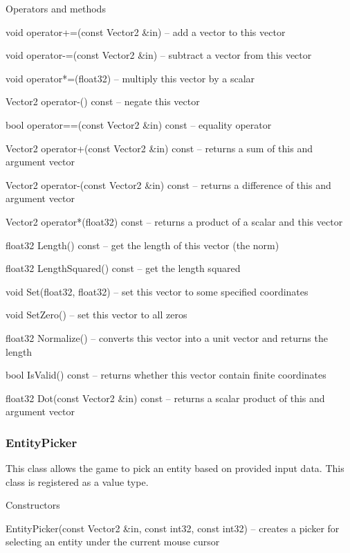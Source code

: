 \begin{titled-itemize}{Operators and methods}
  \item void operator+=(const Vector2 \&in) -- add a vector to this vector
  \item void operator-=(const Vector2 \&in) -- subtract a vector from this vector
  \item void operator*=(float32) -- multiply this vector by a scalar
  \item Vector2 operator-() const -- negate this vector
  \item bool operator==(const Vector2 \&in) const -- equality operator
  \item Vector2 operator+(const Vector2 \&in) const -- returns a sum of this and argument vector
  \item Vector2 operator-(const Vector2 \&in) const -- returns a difference of this and argument vector
  \item Vector2 operator*(float32) const -- returns a product of a scalar and this vector
  \item float32 Length() const -- get the length of this vector (the norm)
  \item float32 LengthSquared() const -- get the length squared
  \item void Set(float32, float32) -- set this vector to some specified coordinates
  \item void SetZero() -- set this vector to all zeros
  \item float32 Normalize() -- converts this vector into a unit vector and returns the length
  \item bool IsValid() const -- returns whether this vector contain finite coordinates
  \item float32 Dot(const Vector2 \&in) const -- returns a scalar product of this and argument vector
\end{titled-itemize}

\subsubsection{EntityPicker}

This class allows the game to pick an entity based on provided input data. This class is registered as a value type.

\begin{titled-itemize}{Constructors}
  \item EntityPicker(const Vector2 \&in, const int32, const int32) -- creates a picker for selecting an entity under the current mouse cursor
\end{titled-itemize}

